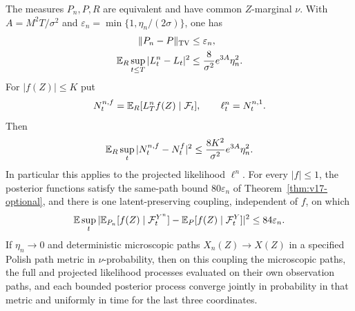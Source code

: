 \begin{theorem}
\label{thm:v18-gaussian}
The measures $P_n,P,R$ are equivalent and have common $Z$-marginal $\nu$.
With $A=M^2T/\sigma^2$ and
$\varepsilon_n=\min\{1,\eta_n/(2\sigma)\}$, one has
\begin{align}
 \|P_n-P\|_{\rm TV}&\le\varepsilon_n,
                     \label{eq:v18-gaussiantv}\\
 \mathbb E_R\sup_{t\le T}|L_t^n-L_t|^2
   &\le\frac8{\sigma^2}e^{3A}\eta_n^2.
                     \label{eq:v18-densityS2}
\end{align}
For $|f(Z)|\le K$ put
\[
 N_t^{n,f}=\mathbb E_R[L_T^nf(Z)\mid\mathcal F_t],\qquad
 \ell_t^n=N_t^{n,1}.
\]
Then
\begin{equation}\label{eq:v18-projectedS2}
 \mathbb E_R\sup_t|N_t^{n,f}-N_t^f|^2
              \le\frac{8K^2}{\sigma^2}e^{3A}\eta_n^2.
\end{equation}
In particular this applies to the projected likelihood $\ell^n$.
For every $|f|\le1$, the posterior functions satisfy the same-path bound
$80\varepsilon_n$ of Theorem~\ref{thm:v17-optional}, and there is one
latent-preserving coupling, independent of $f$, on which
\begin{equation}\label{eq:v18-posteriorS2}
 \mathbb E\sup_t|\mathbb E_{P_n}[f(Z)\mid\mathcal F_t^{Y^n}]
                 -\mathbb E_P[f(Z)\mid\mathcal F_t^Y]|^2
                    \le84\varepsilon_n.
\end{equation}
If $\eta_n\to0$ and deterministic microscopic paths $X_n(Z)\to X(Z)$
in a specified Polish path metric in $\nu$-probability, then on this
coupling the microscopic paths, the full and projected likelihood
processes evaluated on their own observation paths, and each bounded
posterior process converge jointly in probability in that metric and
uniformly in time for the last three coordinates.
\end{theorem}
